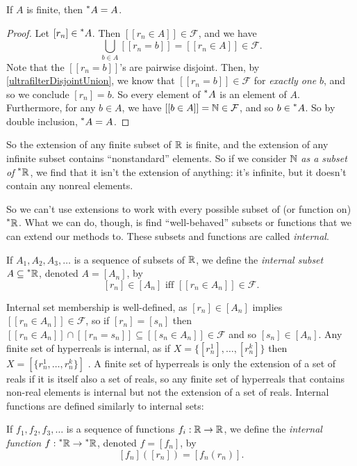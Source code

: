 \begin{thm}
    If $A$ is finite, then $\prescript{*}{}{A} = A$.
\end{thm}

\begin{proof}
    Let $[r_n] \in \prescript{*}{}{A}$. Then $[[r_n \in A]] \in \mathcal{F}$, and we have 
    \[ \bigcup_{b \in A} [[r_n = b]] = [[r_n \in A]] \in \mathcal{F}. \]
    Note that the $[[r_n = b]]$'s are pairwise disjoint. Then, by \autoref{ultrafilterDisjointUnion}, we know that $[[r_n = b]] \in \mathcal{F}$ for \textit{exactly one} $b$, and so we conclude $[r_n] = b$. So every element of $\prescript{*}{}{A}$ is an element of $A$. Furthermore, for any $b \in A$, we have $[[b \in A]] = \mathbb{N} \in \mathcal{F}$, and so $b \in \prescript{*}{}{A}$. So by double inclusion, $\prescript{*}{}{A} = A$. 
\end{proof}

So the extension of any finite subset of $\mathbb{R}$ is finite, and the extension of any infinite subset contains ``nonstandard'' elements. So if we consider $\mathbb{N}$ \textit{as a subset of $\prescript{*}{}{\mathbb{R}}$}, we find that it isn't the extension of anything: it's infinite, but it doesn't contain any nonreal elements.

So we can't use extensions to work with every possible subset of (or function on) $\prescript{*}{}{\mathbb{R}}$. What we can do, though, is find ``well-behaved'' subsets or functions that we can extend our methods to. These subsets and functions are called \textit{internal}.

\begin{defn}
    If $A_1, A_2, A_3, \ldots$ is a sequence of subsets of $\mathbb{R}$, we define the \textit{internal subset} $A \subseteq \prescript{*}{}{\mathbb{R}}$, denoted $A = [A_n]$, by
    \[ [r_n] \in [A_n] \text{ iff } [[r_n \in A_n]] \in \mathcal{F}. \]
\end{defn}

Internal set membership is well-defined, as $[r_n] \in [A_n]$ implies $[[r_n \in A_n]] \in \mathcal{F}$, so if $[r_n] = [s_n]$ then $[[r_n \in A_n]] \cap [[r_n = s_n]] \subseteq [[s_n \in A_n]] \in \mathcal{F}$ and so $[s_n] \in [A_n]$. Any finite set of hyperreals is internal, as if $X = \{[r_n^1], \ldots, [r_n^k]\}$ then $X = [\{r_n^1, \ldots, r_n^k\}]$ \cite[126]{goldblatt1998}. A finite set of hyperreals is only the extension of a set of reals if it is itself also a set of reals, so any finite set of hyperreals that contains non-real elements is internal but not the extension of a set of reals. Internal functions are defined similarly to internal sets:

\begin{defn}
    If $f_1, f_2, f_3, \ldots$ is a sequence of functions $f_i: \mathbb{R} \to \mathbb{R}$, we define the \textit{internal function} $f: \prescript{*}{}{\mathbb{R}} \to \prescript{*}{}{\mathbb{R}}$, denoted $f = [f_n]$, by
    \[ [f_n]([r_n]) = [f_n(r_n)]. \]
\end{defn}



